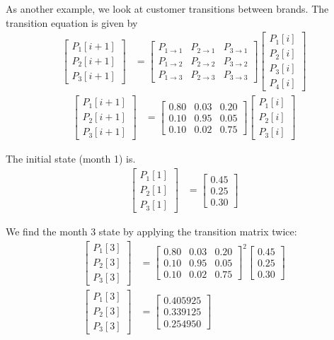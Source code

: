 \documentclass[twocolumn]{myarticle}
\newcommand{\mat}[1]{\begin{bmatrix}#1\end{bmatrix}}
\begin{document}
As another example, we look at customer transitions between brands.
The transition equation is given by
\begin{align}
    \mat{P_1[i+1] \\ P_2[i+1] \\ P_3[i+1]} &= 
    \mat{P_{1 \to 1} & P_{2 \to 1} & P_{3 \to 1} \\
         P_{1 \to 2} & P_{2 \to 2} & P_{3 \to 2} \\
         P_{1 \to 3} & P_{2 \to 3} & P_{3 \to 3} }
    \mat{P_1[i] \\ P_2[i] \\ P_3[i] \\ P_4[i]} 
\end{align}
\begin{align}
    \mat{P_1[i+1] \\ P_2[i+1] \\ P_3[i+1]} &= 
    \mat{0.80 & 0.03 & 0.20 \\
         0.10 & 0.95 & 0.05 \\
         0.10 & 0.02 & 0.75 }
    \mat{P_1[i] \\ P_2[i] \\ P_3[i]} 
\end{align}

The initial state (month 1) is.
\begin{align}
    \mat{P_1[1] \\ P_2[1] \\ P_3[1]} &= \mat{0.45 \\ 0.25 \\ 0.30}
\end{align}

We find the month 3 state by applying the transition matrix twice:
\begin{align}
    \mat{P_1[3] \\ P_2[3] \\ P_3[3]} &= 
    \mat{0.80 & 0.03 & 0.20 \\
         0.10 & 0.95 & 0.05 \\
         0.10 & 0.02 & 0.75 }^2
    \mat{0.45 \\ 0.25 \\ 0.30} 
    \\
    \mat{P_1[3] \\ P_2[3] \\ P_3[3]} &= \mat{0.405925 \\ 0.339125 \\ 0.254950}
\end{align}
\end{document}
